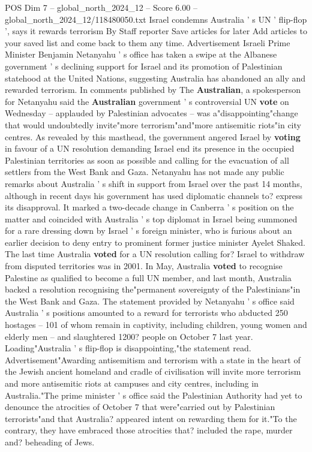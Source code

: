 \begin{textsample}{POS Dim 7 – global\_north\_2024\_12 – Score 6.00 – global\_north\_2024\_12/118480050.txt}  \label{ex:f7_pos_294}
Israel condemns Australia ' s UN ' flip-flop ', says it rewards terrorism By Staff reporter Save articles for later Add articles to your saved list and come back to them any time.
Advertisement Israeli Prime Minister Benjamin Netanyahu ' s office has taken a swipe at the Albanese government ' s declining support for Israel and its promotion of Palestinian statehood at the United Nations, suggesting Australia has abandoned an ally and rewarded terrorism.
In comments published by The \textbf{Australian}, a spokesperson for Netanyahu said the \textbf{Australian} government ' s controversial UN \textbf{vote} on Wednesday -- applauded by Palestinian advocates -- was a"disappointing"change that would undoubtedly invite"more terrorism"and"more antisemitic riots"in city centres.
As revealed by this masthead, the government angered Israel by \textbf{voting} in favour of a UN resolution demanding Israel end its presence in the occupied Palestinian territories as soon as possible and calling for the evacuation of all settlers from the West Bank and Gaza.
Netanyahu has not made any public remarks about Australia ' s shift in support from Israel over the past 14 months, although in recent days his government has used diplomatic channels to? express its disapproval.
It marked a two-decade change in Canberra ' s position on the matter and coincided with Australia ' s top diplomat in Israel being summoned for a rare dressing down by Israel ' s foreign minister, who is furious about an earlier decision to deny entry to prominent former justice minister Ayelet Shaked.
The last time Australia \textbf{voted} for a UN resolution calling for?
Israel to withdraw from disputed territories was in 2001.
In May, Australia \textbf{voted} to recognise Palestine as qualified to become a full UN member, and last month, Australia backed a resolution recognising the"permanent sovereignty of the Palestinians"in the West Bank and Gaza.
The statement provided by Netanyahu ' s office said Australia ' s positions amounted to a reward for terrorists who abducted 250 hostages -- 101 of whom remain in captivity, including children, young women and elderly men -- and slaughtered 1200? people on October 7 last year.
Loading"Australia ' s flip-flop is disappointing,"the statement read.
Advertisement"Awarding antisemitism and terrorism with a state in the heart of the Jewish ancient homeland and cradle of civilisation will invite more terrorism and more antisemitic riots at campuses and city centres, including in Australia."The prime minister ' s office said the Palestinian Authority had yet to denounce the atrocities of October 7 that were"carried out by Palestinian terrorists"and that Australia? appeared intent on rewarding them for it."To the contrary, they have embraced those atrocities that? included the rape, murder and? beheading of Jews.

\end{textsample}
